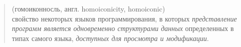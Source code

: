 \label{homoiconic}

\begin{quotation}\noindent
{} (гомоиконносль, англ. homoiconicity, homoiconic)\\
свойство некоторых языков программирования, в которых \emph{представление
программ является одновременно структурами данных} определенных в типах самого
языка, \emph{доступных для просмотра и модификации}.
\end{quotation}
